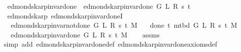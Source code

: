 \begin{isabellebody}
\ \ {\isachardoublequoteopen}edmonds{\isacharunderscore}{\kern0pt}karp{\isacharunderscore}{\kern0pt}invar{\isacharunderscore}{\kern0pt}done{\isacharunderscore}{\kern0pt}{}{\isacharprime}{\kern0pt}{\isacharprime}{\kern0pt}\ {\isasymequiv}\ edmonds{\isacharunderscore}{\kern0pt}karp{\isacharunderscore}{\kern0pt}invar{\isacharunderscore}{\kern0pt}done{\isacharunderscore}{\kern0pt}{}{\isacharprime}{\kern0pt}\ G\ L\ R\ s\ t{\isachardoublequoteclose}\isanewline
\isanewline
{}\isamarkupfalse%
\ {\isacharparenleft}{\kern0pt}\ edmonds{\isacharunderscore}{\kern0pt}karp{\isacharparenright}{\kern0pt}\ edmonds{\isacharunderscore}{\kern0pt}karp{\isacharunderscore}{\kern0pt}invar{\isacharunderscore}{\kern0pt}done{\isacharunderscore}{\kern0pt}{}I{\isacharcolon}{\kern0pt}\isanewline
\ \ \ {\isachardoublequoteopen}edmonds{\isacharunderscore}{\kern0pt}karp{\isacharunderscore}{\kern0pt}invar{\isacharunderscore}{\kern0pt}not{\isacharunderscore}{\kern0pt}done{\isacharunderscore}{\kern0pt}{}{\isacharprime}{\kern0pt}\ G\ L\ R\ s\ t\ M{\isachardoublequoteclose}\isanewline
\ \ \ {\isachardoublequoteopen}done{\isacharunderscore}{\kern0pt}{}\ t\ {\isacharparenleft}{\kern0pt}m{\isacharunderscore}{\kern0pt}tbd\ G\ L\ R\ s\ t\ M{\isacharparenright}{\kern0pt}{\isachardoublequoteclose}\isanewline
\ \ \ {\isachardoublequoteopen}edmonds{\isacharunderscore}{\kern0pt}karp{\isacharunderscore}{\kern0pt}invar{\isacharunderscore}{\kern0pt}done{\isacharunderscore}{\kern0pt}{}{\isacharprime}{\kern0pt}\ G\ L\ R\ s\ t\ M{\isachardoublequoteclose}%
\endisataginvisible
{\isafoldinvisible}%
%
\isadeliminvisible
\isanewline
%
\endisadeliminvisible
%
\isadelimproof
\ \ %
\endisadelimproof
%
\isatagproof
{}\isamarkupfalse%
\ assms\isanewline
\ \ \isamarkupfalse%
\ {\isacharparenleft}{\kern0pt}simp\ add{\isacharcolon}{\kern0pt}\ edmonds{\isacharunderscore}{\kern0pt}karp{\isacharunderscore}{\kern0pt}invar{\isacharunderscore}{\kern0pt}done{\isacharunderscore}{\kern0pt}{}{\isacharunderscore}{\kern0pt}def\ edmonds{\isacharunderscore}{\kern0pt}karp{\isacharunderscore}{\kern0pt}invar{\isacharunderscore}{\kern0pt}done{\isacharunderscore}{\kern0pt}{}{\isacharunderscore}{\kern0pt}axioms{\isacharunderscore}{\kern0pt}def{\isacharparenright}{\kern0pt}%
\endisatagproof
{\isafoldproof}%
%
\isadelimproof
\isanewline
%
\endisadelimproof
%
\isadeliminvisible
\isanewline
%
\endisadeliminvisible
%
\isataginvisible

\end{isabellebody}
